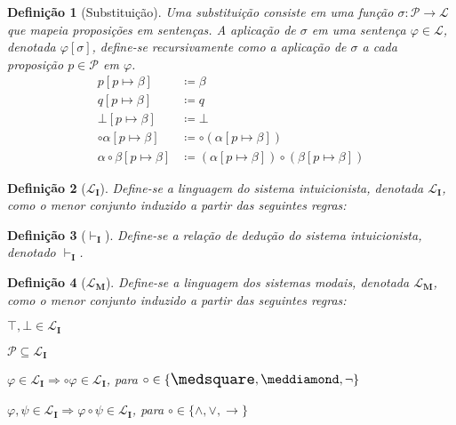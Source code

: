 \documentclass{report}
\newtheorem{definition}{Definição}
\begin{document}
    \begin{definition}[Substituição]
        Uma substituição consiste em uma função $\sigma : \mathcal{P} \to \mathcal{L}$ que mapeia proposições em sentenças. A aplicação de $\sigma$ em uma sentença $\varphi \in \mathcal{L}$, denotada $\varphi[\sigma]$, define-se recursivamente como a aplicação de $\sigma$ a cada proposição $p \in \mathcal{P}$ em $\varphi$.
        \begin{align*}
            p[p \mapsto \beta]                 & \coloneqq \beta                                                  \\
            q[p \mapsto \beta]                 & \coloneqq q                                                      \\
            \bot[p \mapsto \beta]              & \coloneqq \bot                                                   \\
            \circ\alpha[p \mapsto \beta]       & \coloneqq \circ(\alpha[p \mapsto \beta])                         \\
            \alpha\circ\beta[p \mapsto \beta]  & \coloneqq (\alpha[p \mapsto \beta])\circ(\beta[p \mapsto \beta])
            \tag*{\qed} 
        \end{align*}
    \end{definition}    

    \begin{definition}[$\mathcal{L}_\mathbf{I}$]
        Define-se a linguagem do sistema intuicionista, denotada $\mathcal{L}_\mathbf{I}$, como o menor conjunto induzido a partir das seguintes regras:
    \end{definition}

    \begin{definition}[$\vdash_\mathbf{I}$]
        Define-se a relação de dedução do sistema intuicionista, denotado $\vdash_\mathbf{I}$.
    \end{definition}


    \begin{definition}[$\mathcal{L}_\mathbf{M}$]
        Define-se a linguagem dos sistemas modais, denotada $\mathcal{L}_\mathbf{M}$, como o menor conjunto induzido a partir das seguintes regras:
        
        $\top, \bot \in \mathcal{L}_\mathbf{I}$
        
        $\mathcal{P} \subseteq \mathcal{L}_\mathbf{I}$
        
        $\varphi \in \mathcal{L}_\mathbf{I} \Rightarrow \circ \varphi \in \mathcal{L}_\mathbf{I}$, para $\circ \in \{\nec, \pos, \neg\}$

        $\varphi, \psi \in \mathcal{L}_\mathbf{I} \Rightarrow \varphi \circ \psi \in \mathcal{L}_\mathbf{I}$, para $\circ \in \{\wedge, \vee, \to\}$
    \end{definition}
\end{document}
